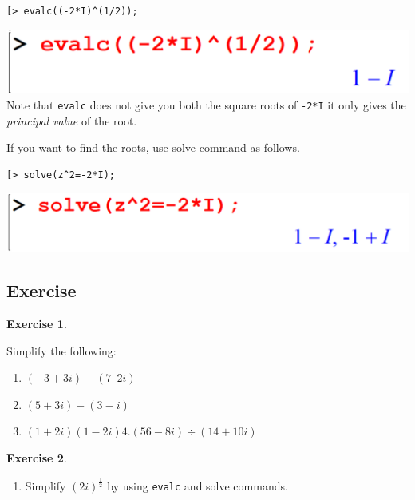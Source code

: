 \documentclass[
]{book}
\providecommand{\tightlist}{%
  \setlength{\itemsep}{0pt}\setlength{\parskip}{0pt}}
\theoremstyle{definition}
\theoremstyle{definition}
\theoremstyle{definition}
\newtheorem{exercise}{Exercise}[chapter]
\theoremstyle{definition}
\theoremstyle{remark}
\begin{document}
\begin{verbatim}
[> evalc((-2*I)^(1/2));
\end{verbatim}

\includegraphics{figures/Lesson 1/fig47.png}
Note that \texttt{evalc} does not give you both the square roots of \texttt{-2*I} it only gives the \emph{principal value} of the root.

If you want to find the roots, use solve command as follows.

\begin{verbatim}
[> solve(z^2=-2*I);
\end{verbatim}

\includegraphics{figures/Lesson 1/fig48.png}

\subsection{Exercise}\label{exercise-1}

\begin{exercise}
\protect\hypertarget{exr:unnamed-chunk-10}{}\label{exr:unnamed-chunk-10}

Simplify the following:

\begin{enumerate}
\def\labelenumi{\arabic{enumi}.}
\tightlist
\item
  \((−3 + 3i) + (7 – 2i)\)
\item
  \((5 + 3i) − (3 − i)\)
\item
  \((1 + 2i)(1 − 2i) 4. (56 − 8i) ÷ (14 + 10i)\)
\end{enumerate}

\end{exercise}

\begin{exercise}
\protect\hypertarget{exr:unnamed-chunk-11}{}\label{exr:unnamed-chunk-11}\leavevmode

\begin{enumerate}
\def\labelenumi{\arabic{enumi}.}
\setcounter{enumi}{1}
\tightlist
\item
  Simplify \((2i)^\frac{1}{2}\) by using \texttt{evalc} and solve commands.
\end{enumerate}

\end{exercise}
\end{document}
